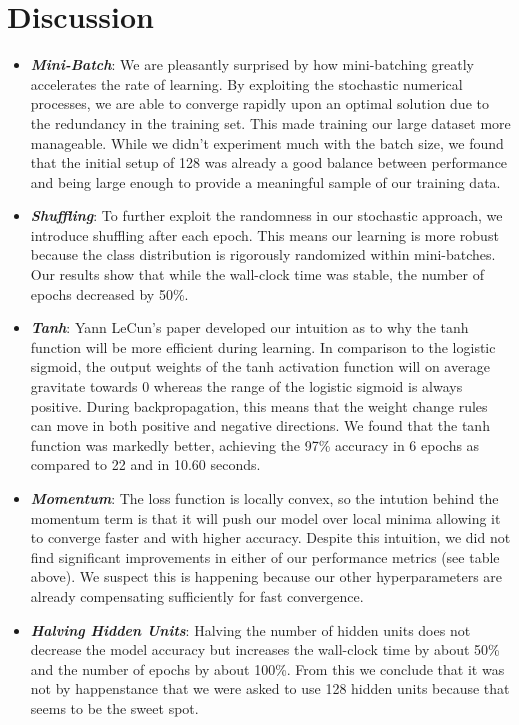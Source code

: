 \documentclass{article} %
\begin{document}
{{\newpage


\section*{Discussion}

\begin{itemize}
\item \textbf{\textit{Mini-Batch}}: We are pleasantly surprised by how mini-batching greatly accelerates the rate of learning.  By exploiting the stochastic numerical processes, we are able to converge rapidly upon an optimal solution due to the redundancy in the training set.  This made training our large dataset more manageable. While we didn't experiment much with the batch size, we found that the initial setup of 128 was already a good balance between performance and being large enough to provide a meaningful sample of our training data. 
\item \textbf{\textit{Shuffling}}: To further exploit the randomness in our stochastic approach, we introduce shuffling after each epoch.  This means our learning is more robust because the class distribution is rigorously randomized within mini-batches.  Our results show that while the wall-clock time was stable, the number of epochs decreased by 50\%. 
\item \textbf{\textit{Tanh}}: Yann LeCun's paper \cite{LeCun} developed our intuition as to why the tanh function will be more efficient during learning.  In comparison to the logistic sigmoid, the output weights of the tanh activation function will on average gravitate towards 0 whereas the range of the logistic sigmoid is always positive.  During backpropagation, this means that the weight change rules can move in both positive and negative directions.  We found that the tanh function was markedly better, achieving the 97\% accuracy in 6 epochs as compared to 22 and in 10.60 seconds. 
\item \textbf{\textit{Momentum}}: The loss function is locally convex, so the intution behind the momentum term is that it will push our model over local minima allowing it to converge faster and with higher accuracy.  Despite this intuition, we did not find significant improvements in either of our performance metrics (see table above).  We suspect this is happening because our other hyperparameters are already compensating sufficiently for fast convergence.  
\item \textbf{\textit{Halving Hidden Units}}: Halving the number of hidden units does not decrease the model accuracy but increases the wall-clock time by about 50\% and the number of epochs by about 100\%.  From this we conclude that it was not by happenstance that we were asked to use 128 hidden units because that seems to be the sweet spot.  

\end{itemize}}}
\end{document}
